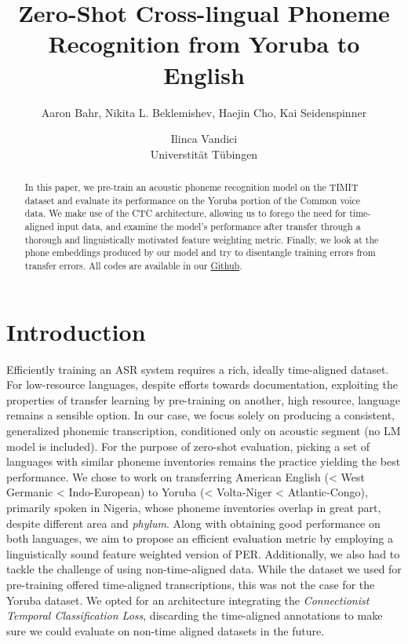 \documentclass[11pt]{article}
\title{Zero-Shot Cross-lingual Phoneme Recognition from Yoruba to English}
\author{Aaron Bahr, Nikita L. Beklemishev, Haejin Cho, Kai Seidenspinner \and Ilinca Vandici \\
         Universtität Tübingen }
\begin{document}
\maketitle
\outauthor
\begin{abstract}
In this paper, we pre-train an acoustic phoneme recognition model on the TIMIT dataset and evaluate its performance on the Yoruba portion of the Common voice data. We make use of the CTC architecture, allowing us to forego the need for time-aligned input data, and examine the model’s performance after transfer through a thorough and linguistically motivated feature weighting metric. Finally, we look at the phone embeddings produced by our model and try to disentangle training errors from transfer errors. All codes are available in our \href{https://github.com/lilovyjgrib/X-lingual_IPA_ASR}{Github}.
\end{abstract}

\section{Introduction}
Efficiently training an ASR system requires a rich, ideally time-aligned dataset. For low-resource languages, despite efforts towards documentation, exploiting the properties of transfer learning by pre-training on another, high resource, language remains a sensible option. In our case, we focus solely on producing a consistent, generalized phonemic transcription, conditioned only on acoustic segment (no LM model is included). For the purpose of zero-shot evaluation, picking a set of languages with similar phoneme inventories remains the practice yielding the best performance. We chose to work on transferring American English (< West Germanic < Indo-European) to Yoruba (< Volta-Niger < Atlantic-Congo), primarily spoken in Nigeria, whose phoneme inventories overlap in great part, despite different area and \textit{phylum}.
Along with obtaining good performance on both languages, we aim to propose an efficient evaluation metric by employing a linguistically sound feature weighted version of PER.
Additionally, we also had to tackle the challenge of using non-time-aligned data. While the dataset we used for pre-training offered time-aligned transcriptions, this was not the case for the Yoruba dataset. We opted for an architecture integrating the \textit{Connectionist Temporal Classification Loss}, discarding the time-aligned annotations to make sure we could evaluate on non-time aligned datasets in the future.
\end{document}

